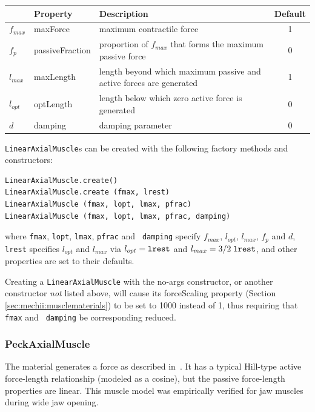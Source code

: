 \begin{center}
\begin{tabular}{|l|l|l|c|} \hline
& Property & Description & Default \\
\hline
$f_{max}$ & {\sf maxForce} & maximum contractile force & 1 \\
$f_{p}$ & {\sf passiveFraction} & 
proportion of $f_{max}$ that forms the maximum passive force & 0 \\
$l_{max}$ & {\sf maxLength} &
length beyond which maximum passive and active forces are generated & 1 \\
$l_{opt}$ & {\sf optLength} &
length below which zero active force is generated & 0 \\
$d$ & {\sf damping} & damping parameter & 0 \\
\hline
\end{tabular}
\end{center}

{\tt LinearAxialMuscle}s can be created with the following factory
methods and constructors:
\begin{lstlisting}[]
LinearAxialMuscle.create()
LinearAxialMuscle.create (fmax, lrest)
LinearAxialMuscle (fmax, lopt, lmax, pfrac)
LinearAxialMuscle (fmax, lopt, lmax, pfrac, damping)
\end{lstlisting}
%
where {\tt fmax}, {\tt lopt}, {\tt lmax}, {\tt pfrac} and {\tt
damping} specify $f_{max}$, $l_{opt}$, $l_{max}$, $f_{p}$ and $d$,
{\tt lrest} specifies $l_{opt}$ and $l_{max}$ via
$l_{opt} = \mathrm{\tt lrest}$ and
$l_{max} = 3/2 \; \mathrm{\tt lrest}$, and other properties are set to
their defaults.

\begin{sideblock}
Creating a {\tt LinearAxialMuscle} with the no-args constructor, or
another constructor {\it not} listed above, will cause its {\sf
forceScaling} property (Section \ref{sec:mechii:musclematerials}) to
be set to 1000 instead of 1, thus requiring that {\tt fmax} and {\tt
damping} be corresponding reduced.
\end{sideblock}

\subsubsection{PeckAxialMuscle}

The 
material generates a force as described in~\cite{peck2000dynamic}. 
It has a typical Hill-type active force-length relationship (modeled
as a cosine), but the passive force-length properties are linear. This
muscle model was empirically verified for jaw muscles during wide jaw
opening.


